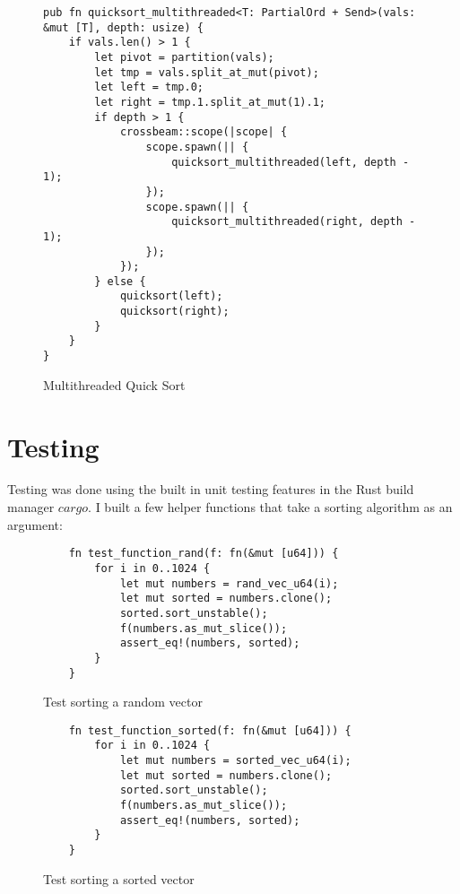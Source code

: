 \documentclass[12pt,letterpaper]{report}
\begin{document}
	\begin{figure}[H]
    \begin{verbatim}
pub fn quicksort_multithreaded<T: PartialOrd + Send>(vals: &mut [T], depth: usize) {
    if vals.len() > 1 {
        let pivot = partition(vals);
        let tmp = vals.split_at_mut(pivot);
        let left = tmp.0;
        let right = tmp.1.split_at_mut(1).1;
        if depth > 1 {
            crossbeam::scope(|scope| {
                scope.spawn(|| {
                    quicksort_multithreaded(left, depth - 1);
                });
                scope.spawn(|| {
                    quicksort_multithreaded(right, depth - 1);
                });
            });
        } else {
            quicksort(left);
            quicksort(right);
        }
    }
}
    \end{verbatim}
    \caption{Multithreaded Quick Sort}
\end{figure}

\newpage

	\section*{Testing}
	
	Testing was done using the built in unit testing features in the Rust build manager $cargo$. I built a few helper functions that take a sorting algorithm as an argument:
	
	\begin{figure}[H]
	\begin{verbatim}
    fn test_function_rand(f: fn(&mut [u64])) {
        for i in 0..1024 {
            let mut numbers = rand_vec_u64(i);
            let mut sorted = numbers.clone();
            sorted.sort_unstable();
            f(numbers.as_mut_slice());
            assert_eq!(numbers, sorted);
        }
    }
 	\end{verbatim}
     \caption{Test sorting a random vector}
\end{figure}

	\begin{figure}[H]
	\begin{verbatim}
    fn test_function_sorted(f: fn(&mut [u64])) {
        for i in 0..1024 {
            let mut numbers = sorted_vec_u64(i);
            let mut sorted = numbers.clone();
            sorted.sort_unstable();
            f(numbers.as_mut_slice());
            assert_eq!(numbers, sorted);
        }
    }
 	\end{verbatim}
     \caption{Test sorting a sorted vector}
\end{figure}
\end{document}

